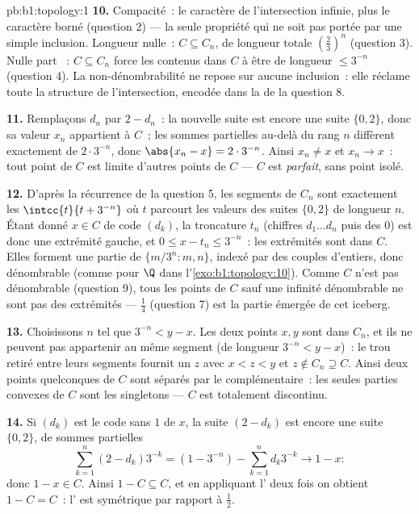 \begin{solution}{pb:b1:topology:1}
\textbf{10.} Compacité~: le caractère  de l'intersection
infinie, plus le caractère borné (question 2) --- la seule propriété
qui ne soit pas portée par une simple inclusion. Longueur nulle~:
$C \subseteq C_n$, de longueur totale $(\frac23)^n$ (question 3).
Nulle part ~: $C \subseteq C_n$ force les  contenus
dans $C$ à être de longueur $\leq 3^{-n}$ (question 4). La
non-dénombrabilité ne repose sur aucune inclusion~: elle réclame
toute la structure de l'intersection, encodée dans la  de
la question 8.

\textbf{11.} Remplaçons $d_n$ par $2 - d_n$~: la nouvelle suite est
encore une suite $\{0,2\}$, donc sa valeur $x_n$ appartient à $C$~;
les sommes partielles au-delà du rang $n$ diffèrent exactement de
$2\cdot3^{-n}$, donc $\abs{x_n - x} = 2\cdot3^{-n}$. Ainsi $x_n \neq
x$ et $x_n \to x$~: tout point de $C$ est limite d'autres points de
$C$ --- $C$ est \emph{parfait}, sans point isolé.

\textbf{12.} D'après la récurrence de la question 5, les segments de
$C_n$ sont exactement les $\intcc{t}{t + 3^{-n}}$ où $t$ parcourt
les valeurs des suites $\{0,2\}$ de longueur $n$. Étant donné $x \in
C$ de code $(d_k)$, la troncature $t_n$ (chiffres $d_1 \dots d_n$
puis des $0$) est donc une extrémité gauche, et $0 \leq x - t_n
\leq 3^{-n}$~: les extrémités sont  dans $C$. Elles forment
une partie de $\{m/3^n : m, n\}$,  indexé par des couples
d'entiers, donc dénombrable (comme pour $\Q$ dans
l'\cref{exo:b1:topology:10}). Comme $C$ n'est pas dénombrable (question
9), tous les points de $C$ sauf une infinité dénombrable ne sont pas
des extrémités --- $\frac14$ (question 7) est la partie émergée de
cet iceberg.

\textbf{13.} Choisissons $n$ tel que $3^{-n} < y - x$. Les deux
points $x, y$ sont dans $C_n$, et ils ne peuvent pas appartenir au
même segment (de longueur $3^{-n} < y - x$)~: le trou retiré entre
leurs segments fournit un $z$ avec $x < z < y$ et $z \notin C_n
\supseteq C$. Ainsi deux points quelconques de $C$ sont séparés par
le complémentaire~: les seules parties convexes de $C$ sont les
singletons --- $C$ est totalement discontinu.

\textbf{14.} Si $(d_k)$ est le code sans $1$ de $x$, la suite
$(2 - d_k)$ est encore une suite $\{0,2\}$, de sommes partielles
\[
\sum_{k=1}^{n} (2 - d_k)3^{-k} = (1 - 3^{-n}) - \sum_{k=1}^n
d_k 3^{-k} \longrightarrow 1 - x :
\]
donc $1 - x \in C$. Ainsi $1 - C \subseteq C$, et en appliquant
l' deux fois on obtient $1 - C = C$~: l' est symétrique par rapport à $\frac12$.


\end{solution}
